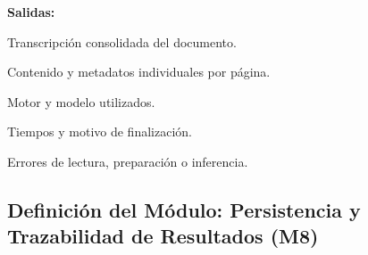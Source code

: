 \begin{definicionmodulo}
\textbf{Salidas:}
\begin{elementosmodulo}
    \item Transcripción consolidada del documento.
    \item Contenido y metadatos individuales por página.
    \item Motor y modelo utilizados.
    \item Tiempos y motivo de finalización.
    \item Errores de lectura, preparación o inferencia.
\end{elementosmodulo}

\end{definicionmodulo}



\subsection{Definición del Módulo: Persistencia y Trazabilidad de Resultados (M8)}
\label{subsec:modulo_m8}

